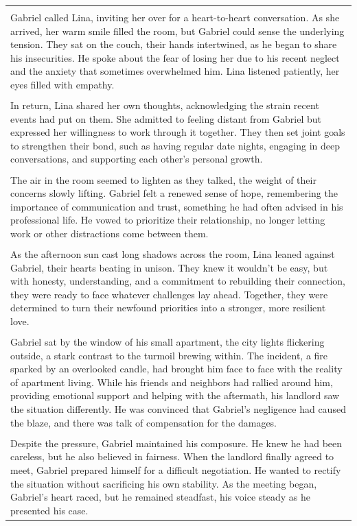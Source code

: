 \begin{small}
\begin{longtable}{p{}}
\\
\\
Gabriel called Lina, inviting her over for a heart-to-heart conversation. As she arrived, her warm smile filled the room, but Gabriel could sense the underlying tension. They sat on the couch, their hands intertwined, as he began to share his insecurities. He spoke about the fear of losing her due to his recent neglect and the anxiety that sometimes overwhelmed him. Lina listened patiently, her eyes filled with empathy.
\\
\\
In return, Lina shared her own thoughts, acknowledging the strain recent events had put on them. She admitted to feeling distant from Gabriel but expressed her willingness to work through it together. They then set joint goals to strengthen their bond, such as having regular date nights, engaging in deep conversations, and supporting each other's personal growth.
\\
\\
The air in the room seemed to lighten as they talked, the weight of their concerns slowly lifting. Gabriel felt a renewed sense of hope, remembering the importance of communication and trust, something he had often advised in his professional life. He vowed to prioritize their relationship, no longer letting work or other distractions come between them.
\\
\\
As the afternoon sun cast long shadows across the room, Lina leaned against Gabriel, their hearts beating in unison. They knew it wouldn't be easy, but with honesty, understanding, and a commitment to rebuilding their connection, they were ready to face whatever challenges lay ahead. Together, they were determined to turn their newfound priorities into a stronger, more resilient love.
\\
\\
Gabriel sat by the window of his small apartment, the city lights flickering outside, a stark contrast to the turmoil brewing within. The incident, a fire sparked by an overlooked candle, had brought him face to face with the reality of apartment living. While his friends and neighbors had rallied around him, providing emotional support and helping with the aftermath, his landlord saw the situation differently. He was convinced that Gabriel's negligence had caused the blaze, and there was talk of compensation for the damages.
\\
\\
Despite the pressure, Gabriel maintained his composure. He knew he had been careless, but he also believed in fairness. When the landlord finally agreed to meet, Gabriel prepared himself for a difficult negotiation. He wanted to rectify the situation without sacrificing his own stability. As the meeting began, Gabriel's heart raced, but he remained steadfast, his voice steady as he presented his case.

\end{longtable}
\end{small}

